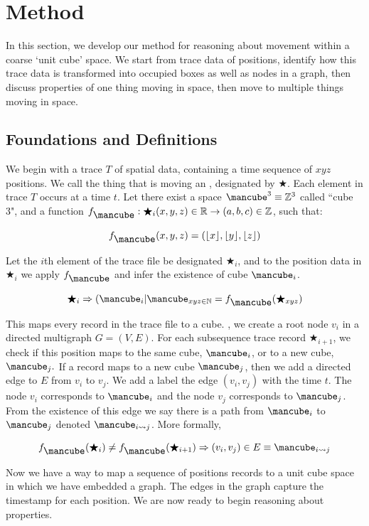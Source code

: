 \section{Method}
\label{sec:method}

In this section, we develop our method for reasoning about movement within a coarse `unit cube' space.
We start from trace data of positions, identify how this trace data is transformed into occupied boxes as well as nodes in a graph, then discuss properties of one thing moving in space, then move to multiple things moving in space.

\subsection{Foundations and Definitions}
We begin with a trace $T$ of spatial data, containing a time sequence of $xyz$ positions.
We call the thing that is moving an , designated by $\bigstar$.
Each element in trace $T$ occurs at a time $t$.
Let there exist a space $\cube^3 \equiv \mathbb{Z}^3$ called ``cube 3", and a function $f_{\cube}: \bigstar_i (x,y,z) \in \mathbb{R} \rightarrow (a,b,c) \in \mathbb{Z}$, such that:

$$f_{\cube}(x,y,z) = (\lfloor x \rfloor, \lfloor y \rfloor , \lfloor z \rfloor )$$

Let the $i$th element of the trace file be designated $\bigstar_i$, and to the position data in $\bigstar_i$ we apply $f_{\cube}$ and infer the existence of cube $\cube_i$.

$$\bigstar_i \Rightarrow (\cube_i | \cube_{xyz\in \mathbb{N}} = f_{\cube}(\bigstar_{xyz})$$ 

This maps every record in the trace file to a cube.
, we create a root node $v_i$ in a directed multigraph $G = (V,E)$.
For each subsequence trace record $\bigstar_{i+1}$, we check if this position maps to the same cube, $\cube_i$, or to a new cube, $\cube_{j}.$
If a record maps to a new cube $\cube_{j}$, then we add a directed edge to $E$ from $v_i$ to $v_{j}$.  
We add a label the edge $(v_i, v_j)$ with the time $t$.
The node $v_i$ corresponds to $\cube_i$ and the node $v_{j}$ corresponds to $\cube_{j}$.
From the existence of this edge we say there is a path from $\cube_i$ to $\cube_j$ denoted $\cube_{i\rightsquigarrow j}$.  More formally,

$$ f_{\cube}(\bigstar_i) \neq f_{\cube}(\bigstar_{i+1}) \Rightarrow (v_i, v_j) \in E \equiv \cube_{i\rightsquigarrow j} $$


Now we have a way to map a sequence of positions records to a unit cube space in which we have embedded a graph.
The edges in the graph capture the timestamp for each position.
We are now ready to begin reasoning about properties.

